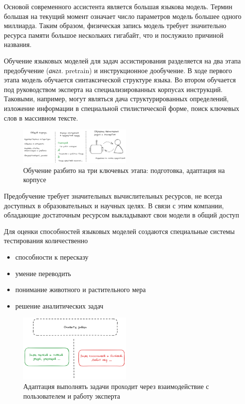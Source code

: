 Основой современного ассистента является большая языкова модель. Термин большая на текущий момент
означает число параметров модель большее одного миллиарда. Таким образом, физическая запись модель требует
значительно ресурса памяти большое нескольких гигабайт, что и послужило причиной названия.  

Обучение языковых моделей для задач ассистирования разделяется на два этапа предобучение (\textit{англ.} pretrain) и инструкционное дообучение.
В ходе первого этапа модель обучается синтаксической структуре языка. 
Во втором обучается под руководством эксперта на специализированных корпусах инструкций. Таковыми, например, могут являться
дача структурированных определений, изложение информации в специальной стилистической форме, поиск ключевых слов в массивном тексте.

\begin{figure}[h]
    \centering
    \includegraphics[width=0.5\textwidth]{assets/work/arch/learning.excalidraw.png}
    \caption{Обучение разбито на три ключевых этапа: подготовка, адаптация на корпусе}
    \label{train}
\end{figure}


Предобучение требует значительных вычислительных ресурсов, 
не всегда доступных в образовательных и научных
целях. В связи с этим компании, обладающие достаточным
ресурсом выкладывают свои модели в общий доступ \cite{jiang2023mistral}\cite{jiang2024mixtral}\cite{touvron2023llama}


Для оценки способностей языковых моделей создаются специальные системы тестирования количественно \begin{itemize}
    \item способности к пересказу
    \item умение переводить
    \item  понимание животного и растительного мера 
    \item решение аналитических задач 
\end{itemize}


\begin{figure}[h]
    \centering
    \includegraphics[width=0.5\textwidth]{assets/work/arch/instruction.excalidraw.png}
    \caption{Адаптация выполнять задачи проходит через взаимодействие с пользователем и работу эксперта}
    \label{instruction}
\end{figure}

